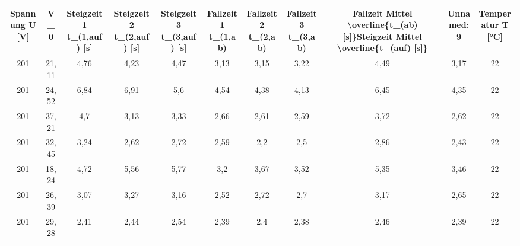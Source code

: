 \begin{table}[!ht]
    \centering
    \begin{tabular}{c c c c c c c c c c c}
        \toprule
        Spannung U [V] &   V\_0 & Steigzeit 1 t\_(1,auf) [s] & Steigzeit 2 t\_(2,auf) [s] & Steigzeit 3 t\_(3,auf) [s] & Fallzeit 1 t\_(1,ab) & Fallzeit 2 t\_(2,ab) & Fallzeit 3 t\_(3,ab) & Fallzeit Mittel \textbackslash overline\{t\_(ab) [s]\}Steigzeit Mittel \textbackslash overline\{t\_(auf) [s]\} & Unnamed: 9 &  Temperatur T [°C] \\
        \midrule
                    201 & 21,11 &                      4,76 &                      4,23 &                      4,47 &                3,13 &                3,15 &                3,22 &                                               4,49 &       3,17 &                 22 \\
                    201 & 24,52 &                      6,84 &                      6,91 &                       5,6 &                4,54 &                4,38 &                4,13 &                                               6,45 &       4,35 &                 22 \\
                    201 & 37,21 &                       4,7 &                      3,13 &                      3,33 &                2,66 &                2,61 &                2,59 &                                               3,72 &       2,62 &                 22 \\
                    201 & 32,45 &                      3,24 &                      2,62 &                      2,72 &                2,59 &                 2,2 &                 2,5 &                                               2,86 &       2,43 &                 22 \\
                    201 & 18,24 &                      4,72 &                      5,56 &                      5,77 &                 3,2 &                3,67 &                3,52 &                                               5,35 &       3,46 &                 22 \\
                    201 & 26,39 &                      3,07 &                      3,27 &                      3,16 &                2,52 &                2,72 &                 2,7 &                                               3,17 &       2,65 &                 22 \\
                    201 & 29,28 &                      2,41 &                      2,44 &                      2,54 &                2,39 &                 2,4 &                2,38 &                                               2,46 &       2,39 &                 22 \\

\end{tabular}
\end{table}
